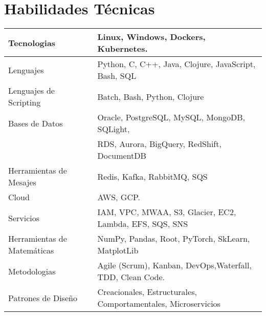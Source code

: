 \section{Habilidades Técnicas}

\begin{center}
  \begin{tabular}{|| l | l ||}
      \hline
      Tecnologias & Linux, Windows, Dockers, Kubernetes. \\
      \hline
      Lenguajes & Python, C, C++, Java, Clojure, JavaScript, Bash, SQL \\
    \hline
      Lenguajes de Scripting \hspace{1mm} & Batch, Bash, Python, Clojure \\
    \hline
      Bases de Datos & Oracle, PostgreSQL, MySQL, MongoDB, SQLight, \\ & RDS, Aurora, BigQuery, RedShift, DocumentDB \\
    \hline
      Herramientas de Mesajes & Redis, Kafka, RabbitMQ, SQS  \\
    \hline
      Cloud & AWS, GCP.  \\
    \hline
      Servicios & IAM, VPC, MWAA, S3, Glacier, EC2, Lambda, EFS, SQS, SNS \hspace{1mm} \\
    \hline
      Herramientas de Matemáticas & NumPy, Pandas, Root, PyTorch, SkLearn, MatplotLib\\
    \hline
      Metodologias & Agile (Scrum), Kanban, DevOps,Waterfall, TDD, Clean Code. \\
    \hline
      Patrones de Diseño & Creacionales, Estructurales, Comportamentales, Microservicios \\
    \hline
  \end{tabular}
\end{center}

